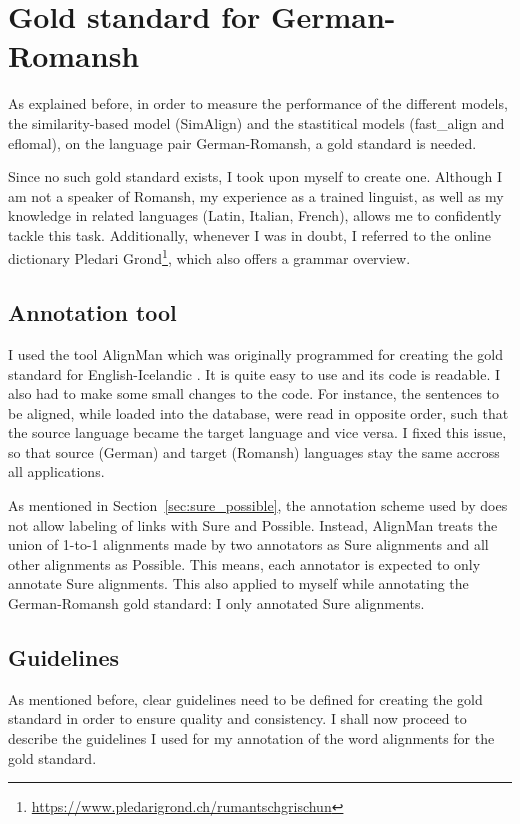 \section{Gold standard for German-Romansh}
As explained before, in order to measure the performance of the different models, the similarity-based model (SimAlign) and the stastitical models (fast\_align and eflomal), on the language pair German-Romansh, a gold standard is needed. 

Since no such gold standard exists, I took upon myself to create one. 
Although I am not a speaker of Romansh, my experience as a trained linguist, as well as my knowledge in related languages (Latin, Italian, French), allows me to confidently tackle this task. 
Additionally, whenever I was in doubt, I referred to the online dictionary Pledari Grond\footnote{\url{https://www.pledarigrond.ch/rumantschgrischun}}, which also offers a grammar overview. 

\subsection{Annotation tool}
\label{sec:AlignMan}
I used the tool AlignMan which was originally programmed for creating the gold standard for English-Icelandic \autocite{steingrimsson-etal-2021-combalign}. 
It is quite easy to use and its code is readable. 
I also had to make some small changes to the code. 
For instance, the sentences to be aligned, while loaded into the database, were read in opposite order, such that the source language became the target language and vice versa. 
I fixed this issue, so that source (German) and target (Romansh) languages stay the same accross all applications.

As mentioned in Section~\ref{sec:sure_possible}, the annotation scheme used by \textcite{steingrimsson-etal-2021-combalign} does not allow labeling of links with Sure and Possible. 
Instead, AlignMan treats the union of 1-to-1 alignments made by two annotators as Sure alignments and all other alignments as Possible. 
This means, each annotator is expected to only annotate Sure alignments. This also applied to myself while annotating the German-Romansh gold standard: I only annotated Sure alignments. 


\subsection{Guidelines}
As mentioned before, clear guidelines need to be defined for creating the gold standard in order to ensure quality and consistency. I shall now proceed to describe the guidelines I used for my annotation of the word alignments for the gold standard.

